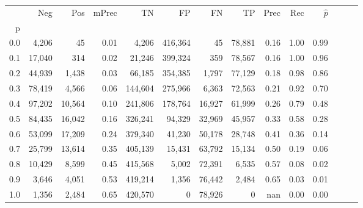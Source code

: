 \begin{tabular}{rrrrrrrrrrrrrr}
\toprule
{} &     Neg &     Pos & mPrec &       TN &       FP &      FN &      TP &  Prec &   Rec & $\hat{p}$ \\
p   &         &         &       &          &          &         &         &       &       &           \\
\midrule
0.0 &   4,206 &      45 &  0.01 &    4,206 &  416,364 &      45 &  78,881 &  0.16 &  1.00 &      0.99 \\
0.1 &  17,040 &     314 &  0.02 &   21,246 &  399,324 &     359 &  78,567 &  0.16 &  1.00 &      0.96 \\
0.2 &  44,939 &   1,438 &  0.03 &   66,185 &  354,385 &   1,797 &  77,129 &  0.18 &  0.98 &      0.86 \\
0.3 &  78,419 &   4,566 &  0.06 &  144,604 &  275,966 &   6,363 &  72,563 &  0.21 &  0.92 &      0.70 \\
0.4 &  97,202 &  10,564 &  0.10 &  241,806 &  178,764 &  16,927 &  61,999 &  0.26 &  0.79 &      0.48 \\
0.5 &  84,435 &  16,042 &  0.16 &  326,241 &   94,329 &  32,969 &  45,957 &  0.33 &  0.58 &      0.28 \\
0.6 &  53,099 &  17,209 &  0.24 &  379,340 &   41,230 &  50,178 &  28,748 &  0.41 &  0.36 &      0.14 \\
0.7 &  25,799 &  13,614 &  0.35 &  405,139 &   15,431 &  63,792 &  15,134 &  0.50 &  0.19 &      0.06 \\
0.8 &  10,429 &   8,599 &  0.45 &  415,568 &    5,002 &  72,391 &   6,535 &  0.57 &  0.08 &      0.02 \\
0.9 &   3,646 &   4,051 &  0.53 &  419,214 &    1,356 &  76,442 &   2,484 &  0.65 &  0.03 &      0.01 \\
1.0 &   1,356 &   2,484 &  0.65 &  420,570 &        0 &  78,926 &       0 &   nan &  0.00 &      0.00 \\
\bottomrule
\end{tabular}
